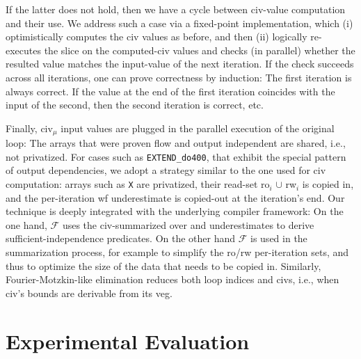 \documentclass[10pt,nocopyrightspace]{sigplanconf}
\begin{document}
If the latter does not hold, %
then we have a cycle between {\sc civ}-value computation and their use.   
We address such a case via a fixed-point implementation,
which (i) optimistically computes the {\sc civ} values as before, and then (ii) logically 
re-executes the slice on the computed-{\sc civ} values and checks (in parallel) 
whether the resulted value matches the input-value of the next iteration. 
%
If the check succeeds across all iterations, one can prove correctness by induction:
The first iteration is always correct. If the value at the end of the first iteration 
coincides with the input of the second, then the second iteration 
is correct, etc.%


Finally, {\sc civ}$_\mu$ input values are plugged in the 
parallel execution of the original loop: The arrays that were proven flow and output
independent are shared, i.e., not privatized.   For cases such as {\tt EXTEND\_do400},
that exhibit the special pattern of output dependencies, we adopt a strategy similar
to the one used for {\sc civ} computation: arrays such as {\tt X} are privatized,
their read-set {\sc ro}$_i$ $\cup$ {\sc rw}$_i$ is copied in, and the per-iteration 
{\sc wf} underestimate
is copied-out at the iteration's end.   Our technique is deeply integrated with the
underlying compiler framework: On the one hand, $\mathcal{F}$ uses the {\sc civ}-summarized
over and underestimates to derive sufficient-independence predicates.
%
On the other hand $\mathcal{F}$ is used in the summarization process, for example 
to simplify the {\sc ro}/{\sc rw} per-iteration sets, and thus to optimize the 
size of the data that needs to be copied in.  Similarly, Fourier-Motzkin-like
elimination reduces both loop indices and {\sc civ}s, i.e., when {\sc civ}'s 
bounds are derivable from its {\sc veg}. %



\section{Experimental Evaluation}
\label{sec:EmpEval}
\end{document}
